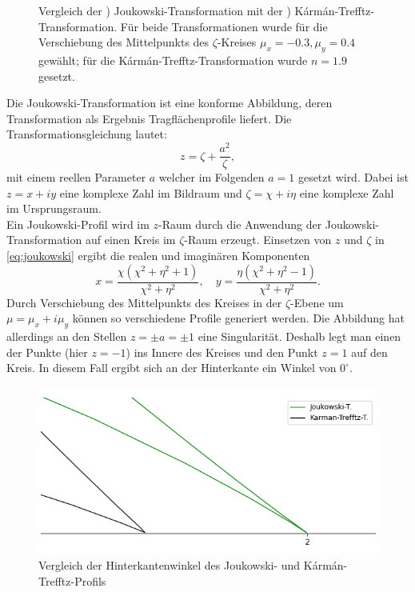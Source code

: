 \begin{figure}[]
\begin{subfigure}[b]{0.5\linewidth}
    \caption{\label{fig:karmantrefftztrans}}
  \end{subfigure}
  \caption{Vergleich der ) Joukowski-Transformation mit der ) Kármán-Trefftz-Transformation. Für beide Transformationen wurde für die Verschiebung des Mittelpunkts des $\zeta $-Kreises $\mu_x = -0.3, \mu_y =0.4$ gewählt; für die Kármán-Trefftz-Transformation wurde $n=1.9$ gesetzt.\label{fig:joukar}}
\end{figure}
Die Joukowski-Transformation ist eine konforme Abbildung, deren Transformation als Ergebnis Tragflächenprofile liefert. Die Transformationsgleichung lautet:
\begin{equation}
\label{eq:joukowski}
z = \zeta + \frac{a^2}{\zeta},
\end{equation}
mit einem reellen Parameter $a$ welcher im Folgenden $a=1$ gesetzt wird. Dabei ist $z = x + iy$ eine komplexe Zahl im Bildraum und $\zeta = \chi + i \eta$ eine komplexe Zahl im Ursprungsraum. \\
Ein Joukowski-Profil wird im $z$-Raum durch die Anwendung der Joukowski-\\Transformation auf einen Kreis im $\zeta$-Raum erzeugt. Einsetzen von $z$ und $\zeta$ in \eqref{eq:joukowski} ergibt die realen und imaginären Komponenten
\begin{equation}
x={\frac {\chi \left(\chi ^{2}+\eta ^{2}+1\right)}{\chi ^{2}+\eta ^{2}}}, \quad y={\frac {\eta \left(\chi ^{2}+\eta ^{2}-1\right)}{\chi ^{2}+\eta ^{2}}}.
\end{equation}
Durch Verschiebung des Mittelpunkts des Kreises in der $\zeta$-Ebene um $\mu = \mu_x + i\mu _y$  können so verschiedene Profile generiert werden. Die Abbildung hat allerdings an den Stellen $z = \pm a = \pm 1$ eine Singularität. Deshalb legt man einen der Punkte (hier $z = -1$) ins Innere des Kreises und den Punkt $z=1$ auf den Kreis. In diesem Fall ergibt sich an der Hinterkante ein Winkel von $0^{\circ}$. \\
\begin{figure}[!ht]
\begin{center} \includegraphics[scale=0.5]{figures/zoomedjouk.png} \end{center}
\caption{Vergleich der Hinterkantenwinkel des Joukowski- und Kármán-Trefftz-Profils}
\label{fig:zoomedjouk}
\end{figure}
